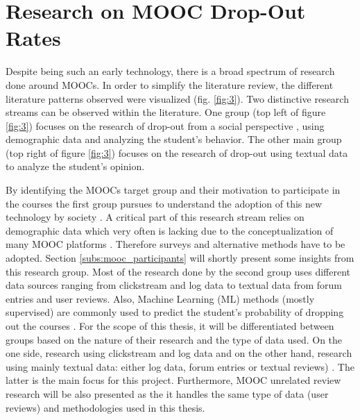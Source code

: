 \documentclass[
	a4paper,
	pdftex,
	12pt,	
	footinclude=true,
	fleqn,
	final,
	]{report}%
\begin{document}
\vspace{-0.45cm}
\section{Research on MOOC Drop-Out Rates}
\label{sec:mooc_research}
\vspace{-0.3cm}
Despite being such an early technology, there is a broad spectrum of research done around MOOCs. 
In order to simplify the literature review, the different literature patterns observed were visualized (fig. \ref{fig:3}). 
Two distinctive research streams can be observed within the literature. One group (top left of figure \ref{fig:3}) focuses on 
the research of drop-out from a social perspective \cite{Haggard2013,Conole2013}, 
using demographic data \cite{Ho2013,Ho2015a,Hansen2015,Christensen2013}
and analyzing the student's behavior. The other main group (top right of figure \ref{fig:3})
focuses on the research of drop-out using textual data to analyze the student's opinion.

By identifying the MOOCs target group and their motivation to participate in the courses
\cite{Hayes2015,Ho2013,Ho2015a} the first group pursues to understand the adoption 
of this new technology by society \cite{Russell2013}. A critical part of this research stream 
relies on demographic data which very often is lacking due to the conceptualization of 
many MOOC platforms \cite{Christensen2013}. Therefore surveys \cite{Christensen2013,Haggard2013} 
and alternative methods \cite{Rose2014,Hansen2015} have to be adopted. 
Section \ref{subs:mooc_participants} will shortly present some insights 
from this research group. Most of the research done by the second group uses different data sources ranging from clickstream and log data 
to textual data from forum entries and user reviews. Also, Machine Learning (ML) methods (mostly supervised) are commonly used 
to predict the student's probability of dropping out the courses \cite{Balakrishnan2013,Taylor2012,Wong2015}. 
For the scope of this thesis, it will be differentiated between groups based on the nature of their research and 
the type of data used. On the one side, 
research using clickstream and log data \cite{Balakrishnan2013,Open2014,Wen2014} and on the other hand, 
research using mainly textual data: either log data, forum entries or textual reviews) \cite{Adamopoulos2013,Taylor2012,Rose2014,Onah2014,Wong2015,Wen2014a,Stump2013,Wen2014}.
The latter is the main focus for this project. Furthermore, MOOC unrelated review research \cite{Pang2002,Pang2008} will be also presented as
the it handles the same type of data (user reviews) and methodologies used in this thesis.
\end{document}
